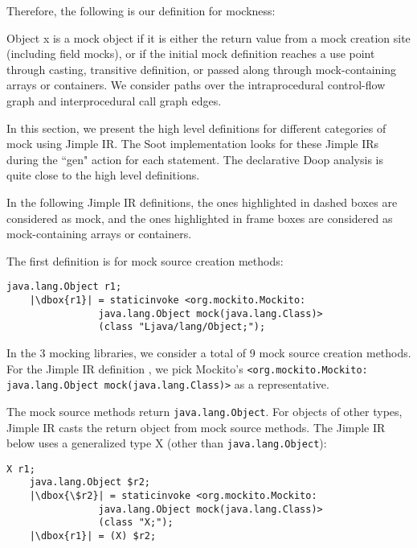 Therefore, the following is our definition for mockness:

\begin{defn}
Object x is a mock object if it is either the return value from a mock creation site (including field mocks), or if the initial mock definition reaches a use point through casting, transitive definition, or passed along through mock-containing arrays or containers. We consider paths over the intraprocedural control-flow graph and interprocedural call graph edges.
\end{defn}

In this section, we present the high level definitions for different categories of mock using Jimple IR. The Soot implementation looks for these Jimple IRs during the ``gen" action for each statement. The declarative Doop analysis is quite close to the high level definitions.

In the following Jimple IR definitions, the ones highlighted in dashed boxes are considered as mock, and the ones highlighted in frame boxes are considered as mock-containing arrays or containers.

The first definition is for mock source creation methods: 

\begin{lstlisting}[basicstyle=\linespread{1.0}\ttfamily\small,numbers=none,escapechar={|}]
	java.lang.Object r1;
	|\dbox{r1}| = staticinvoke <org.mockito.Mockito:
				java.lang.Object mock(java.lang.Class)>
				(class "Ljava/lang/Object;");

\end{lstlisting}

In the 3 mocking libraries, we consider a total of 9 mock source creation methods. For the Jimple IR definition , we pick Mockito's \texttt{<org.mockito.Mockito: java.lang.Object mock(java.lang.Class)>} as a representative.

The mock source methods return \texttt{java.lang.Object}. For objects of other types, Jimple IR casts the return object from mock source methods. The Jimple IR below uses a generalized type X (other than \texttt{java.lang.Object}):

\begin{lstlisting}[basicstyle=\linespread{1.0}\ttfamily\small,numbers=none,escapechar={|}]
	X r1;
	java.lang.Object $r2;
	|\dbox{\$r2}| = staticinvoke <org.mockito.Mockito: 
				java.lang.Object mock(java.lang.Class)>
				(class "X;");
	|\dbox{r1}| = (X) $r2;
\end{lstlisting}

